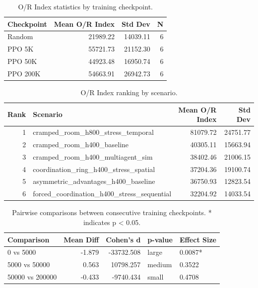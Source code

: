 \begin{table}
\caption{O/R Index statistics by training checkpoint.}
\label{tab:or_index_checkpoint}
\begin{tabular}{lrrr}
\toprule
Checkpoint & Mean O/R Index & Std Dev & N \\
\midrule
Random & 21989.22 & 14039.11 & 6 \\
PPO 5K & 55721.73 & 21152.30 & 6 \\
PPO 50K & 44923.48 & 16950.74 & 6 \\
PPO 200K & 54663.91 & 26942.73 & 6 \\
\bottomrule
\end{tabular}
\end{table}


\begin{table}
\caption{O/R Index ranking by scenario.}
\label{tab:or_index_scenario}
\begin{tabular}{rlrr}
\toprule
Rank & Scenario & Mean O/R Index & Std Dev \\
\midrule
1 & cramped\_room\_h800\_stress\_temporal & 81079.72 & 24751.77 \\
2 & cramped\_room\_h400\_baseline & 40305.11 & 15663.94 \\
3 & cramped\_room\_h400\_multiagent\_sim & 38402.46 & 21006.15 \\
4 & coordination\_ring\_h400\_stress\_spatial & 37204.36 & 19100.74 \\
5 & asymmetric\_advantages\_h400\_baseline & 36750.93 & 12823.54 \\
6 & forced\_coordination\_h400\_stress\_sequential & 32204.92 & 14033.54 \\
\bottomrule
\end{tabular}
\end{table}


\begin{table}
\caption{Pairwise comparisons between consecutive training checkpoints. * indicates p < 0.05.}
\label{tab:pairwise_checkpoints}
\begin{tabular}{lrrll}
\toprule
Comparison & Mean Diff & Cohen's d & p-value & Effect Size \\
\midrule
0 vs 5000 & -1.879 & -33732.508 & large & 0.0087* \\
5000 vs 50000 & 0.563 & 10798.257 & medium & 0.3522 \\
50000 vs 200000 & -0.433 & -9740.434 & small & 0.4708 \\
\bottomrule
\end{tabular}
\end{table}
